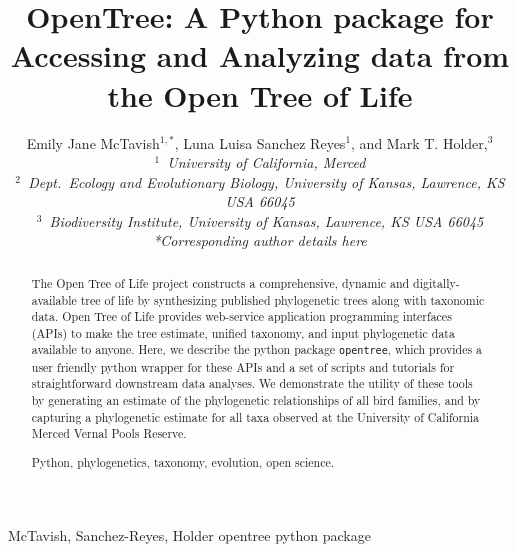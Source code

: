 \documentclass[oupdraft]{sysbio_sse}
\begin{document}
\title{OpenTree: A Python package for Accessing and Analyzing data from the Open Tree of Life}

\author{Emily Jane McTavish$^{1,\ast}$, Luna Luisa Sanchez Reyes$^{1}$, and
Mark T. Holder,$^{3}$\\[4pt]
\textit{$^{1}$~University of California, Merced}
\\
\textit{$^{2}$~Dept.~Ecology and Evolutionary Biology, University of Kansas, Lawrence, KS USA 66045}\\
\textit{$^{3}$~Biodiversity Institute, University of Kansas, Lawrence, KS USA 66045}
\\[2pt]
\textit{*Corresponding author details here}}

\markboth%
{McTavish, Sanchez-Reyes, Holder}
{opentree python package}

\maketitle

\begin{abstract}
{The Open Tree of Life project constructs a comprehensive, dynamic and digitally-available tree of life by synthesizing published phylogenetic trees along with taxonomic data.
Open Tree of Life provides web-service application programming interfaces (APIs) to make the tree estimate, unified taxonomy, and input phylogenetic data available to anyone.
Here, we describe the python package \texttt{opentree}, which provides a user friendly python wrapper for these APIs and a set of scripts and tutorials for straightforward downstream data analyses.
We demonstrate the utility of these tools by generating an estimate of the phylogenetic relationships of all bird families, and by capturing a phylogenetic estimate for all taxa  observed at the University of California Merced Vernal Pools Reserve.
}

{Python, phylogenetics, taxonomy, evolution, open science.}
\end{abstract}
\newline
\end{document}
